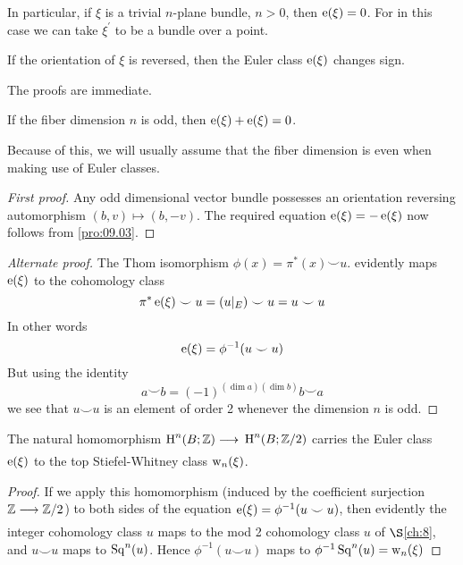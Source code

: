\documentclass[../main]{subfiles}
\begin{document}
In particular, if $\xi$ is a trivial $n$-plane bundle, $n>0$, then $\operatorname{e}(\xi)=0$. For in this case we can take $\xi^{\prime}$ to be a bundle over a point.

\begin{property}\label{pro:09.03}
If the orientation of $\xi$ is reversed, then the Euler class $\operatorname{e} (\xi)$ changes sign.

\end{property} 
The proofs are immediate.

\begin{property}\label{pro:09.04} If the fiber dimension $n$ is odd, then $\operatorname{e}(\xi)+\operatorname{e}(\xi)=0$.

\end{property}
Because of this, we will usually assume that the fiber dimension is even when making use of Euler classes.
\begin{proof}[First proof] Any odd dimensional vector bundle possesses an orientation reversing automorphism $(b, v) \mapsto(b,-v)$. The required equation $\operatorname{e}(\xi)=-\operatorname{e}(\xi)$ now follows from \ref{pro:09.03}.

\end{proof}

\begin{proof}[Alternate proof] The Thom isomorphism $\phi(x)=\pi^{*}(x) \smile u.$ evidently maps $\operatorname{e}(\xi)$ to the cohomology class
\[
\pi^{*} \operatorname{e}(\xi) \smile u=(u |_{E}) \smile u=u \smile u
\]
In other words
\[
\operatorname{e}(\xi)=\phi^{-1}(u \smile u)
\]
But using the identity
\[
a \smile b=(-1)^{(\dim a)(\dim b)} b \smile a
\]
we see that $u \smile u$ is an element of order 2 whenever the dimension $n$ is odd.

\end{proof}

\begin{property}\label{pro:09.05}
 The natural homomorphism $\homology^{n}(\base ; \mathbb{Z}) \varrightarrow{}$ $\operatorname{H}^{n}(B ; \mathbb{Z} / 2)$ carries the Euler class $\operatorname{e}(\xi)$ to the top Stiefel-Whitney class $\operatorname{w}_{n}(\xi)$.
\end{property}
\begin{proof} If we apply this homomorphism (induced by the coefficient surjection $\mathbb{Z} \varrightarrow{} \mathbb{Z} / 2$) to both sides of the equation $\operatorname{e}(\xi)=\phi^{-1}(u \smile u)$, then evidently the integer cohomology class $u$ maps to the mod 2 cohomology class $u$ of $\S$\ref{ch:8}, and $u \smile u$ maps to $\operatorname{Sq}^{n}(u)$. Hence $\phi^{-1}(u \smile u)$ maps to $\phi^{-1} \operatorname{Sq}^{n}(u)=\operatorname{w}_{n}(\xi)$
\end{proof}
\end{document}
